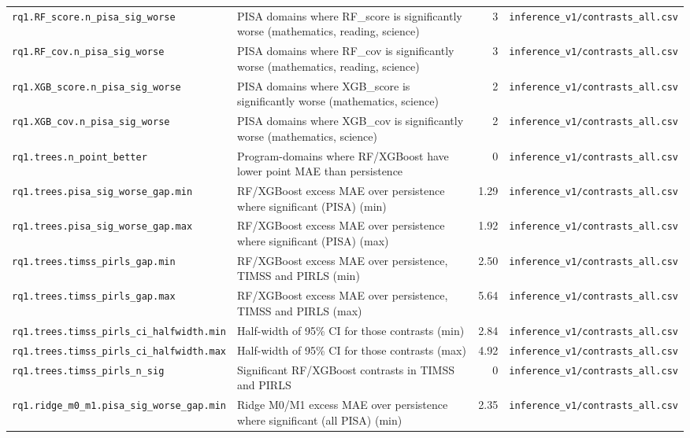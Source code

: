 {\begin{longtable}{p{4.6cm}p{5.6cm}rp{3.6cm}}
\texttt{rq1.RF\_score.n\_pisa\_sig\_worse} & PISA domains where RF\_score is significantly worse (mathematics, reading, science) & 3 & \texttt{inference\_v1/contrasts\_all.csv} \\
\texttt{rq1.RF\_cov.n\_pisa\_sig\_worse} & PISA domains where RF\_cov is significantly worse (mathematics, reading, science) & 3 & \texttt{inference\_v1/contrasts\_all.csv} \\
\texttt{rq1.XGB\_score.n\_pisa\_sig\_worse} & PISA domains where XGB\_score is significantly worse (mathematics, science) & 2 & \texttt{inference\_v1/contrasts\_all.csv} \\
\texttt{rq1.XGB\_cov.n\_pisa\_sig\_worse} & PISA domains where XGB\_cov is significantly worse (mathematics, science) & 2 & \texttt{inference\_v1/contrasts\_all.csv} \\
\texttt{rq1.trees.n\_point\_better} & Program-domains where RF/XGBoost have lower point MAE than persistence & 0 & \texttt{inference\_v1/contrasts\_all.csv} \\
\texttt{rq1.trees.pisa\_sig\_worse\_gap.min} & RF/XGBoost excess MAE over persistence where significant (PISA) (min) & 1.29 & \texttt{inference\_v1/contrasts\_all.csv} \\
\texttt{rq1.trees.pisa\_sig\_worse\_gap.max} & RF/XGBoost excess MAE over persistence where significant (PISA) (max) & 1.92 & \texttt{inference\_v1/contrasts\_all.csv} \\
\texttt{rq1.trees.timss\_pirls\_gap.min} & RF/XGBoost excess MAE over persistence, TIMSS and PIRLS (min) & 2.50 & \texttt{inference\_v1/contrasts\_all.csv} \\
\texttt{rq1.trees.timss\_pirls\_gap.max} & RF/XGBoost excess MAE over persistence, TIMSS and PIRLS (max) & 5.64 & \texttt{inference\_v1/contrasts\_all.csv} \\
\texttt{rq1.trees.timss\_pirls\_ci\_halfwidth.min} & Half-width of 95\% CI for those contrasts (min) & 2.84 & \texttt{inference\_v1/contrasts\_all.csv} \\
\texttt{rq1.trees.timss\_pirls\_ci\_halfwidth.max} & Half-width of 95\% CI for those contrasts (max) & 4.92 & \texttt{inference\_v1/contrasts\_all.csv} \\
\texttt{rq1.trees.timss\_pirls\_n\_sig} & Significant RF/XGBoost contrasts in TIMSS and PIRLS & 0 & \texttt{inference\_v1/contrasts\_all.csv} \\
\texttt{rq1.ridge\_m0\_m1.pisa\_sig\_worse\_gap.min} & Ridge M0/M1 excess MAE over persistence where significant (all PISA) (min) & 2.35 & \texttt{inference\_v1/contrasts\_all.csv} \\

\end{longtable}}
